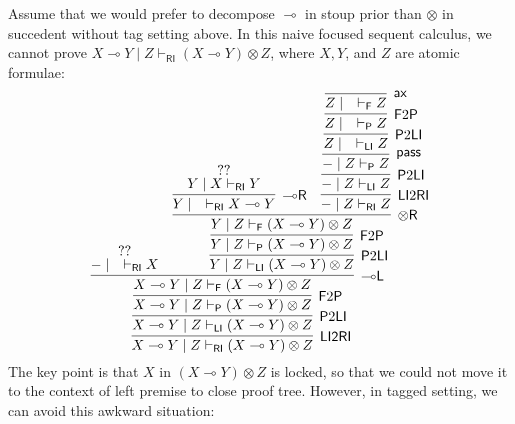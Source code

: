 \documentclass[submission,copyright,creativecommons]{eptcs}
\theoremstyle{definition}
\newcommand{\tr}{\otimes \mathsf{R}}
\newcommand{\lright}{{\multimap}\mathsf{R}}
\newcommand{\lleft}{{\multimap}\mathsf{L}}
\newcommand{\pass}{\mathsf{pass}}
\newcommand{\ax}{\mathsf{ax}}
\newcommand{\ot}{\otimes}
\newcommand{\lolli}{\multimap}
\newcommand{\RI}{\mathsf{RI}}
\newcommand{\LI}{\mathsf{LI}}
\newcommand{\Pass}{\mathsf{P}}
\newcommand{\F}{\mathsf{F}}
\begin{document}
Assume that we would prefer to decompose $\lolli$ in stoup prior than $\ot$ in succedent without tag setting above.
In this naive focused sequent calculus, we cannot prove $X \lolli Y \mid Z \vdash_{\RI} (X \lolli Y) \ot Z$, where $X, Y$, and $Z$ are atomic formulae:
\begin{displaymath}
  \infer[\mathsf{\LI 2 \RI}]{X \multimap Y \mid Z \vdash_{\mathsf{RI}} (X\multimap Y) \otimes Z}{
    \infer[\Pass 2 \LI]{X \multimap Y \mid Z \vdash_{\mathsf{LI}} (X\multimap Y) \otimes Z}{
      \infer[\F 2 \Pass]{X \multimap Y \mid Z \vdash_{\Pass} (X\multimap Y) \otimes Z}{
        \infer[\lleft]{X \multimap Y \mid Z \vdash_{\F} (X\multimap Y) \otimes Z}{
          \deduce{- \mid \quad \vdash_{\RI} X}{??}
          &
          \infer[\Pass 2 \LI]{Y \mid Z \vdash_{\LI} (X \lolli Y) \ot Z}{
            \infer[\F 2 \Pass]{Y \mid Z \vdash_{\Pass} (X \lolli Y) \ot Z}{
              \infer[\tr]{Y \mid Z \vdash_{\F} (X \lolli Y) \ot Z}{
                \infer[\lright]{Y \mid \quad \vdash_{\RI} X \lolli Y}{
                  \deduce{Y \mid X \vdash_{\RI} Y}{??}
                }
                &
                \infer[\LI 2 \RI]{- \mid Z \vdash_{\RI} Z}{
                  \infer[\Pass 2 \LI]{- \mid Z \vdash_{\LI} Z}{
                    \infer[\pass]{- \mid Z \vdash_{\Pass} Z}{
                      \infer[\Pass 2 \LI]{Z \mid \quad \vdash_{\LI} Z}{
                        \infer[\F 2 \Pass]{Z \mid \quad \vdash_{\Pass} Z}{
                          \infer[\ax]{Z \mid \quad \vdash_{\F} Z}{}
                        }
                      }
                    }
                  }
                }
              }
            }
          }
        }
      }
    }
  }
\end{displaymath}
The key point is that $X$ in $(X \lolli Y) \ot Z$ is locked, so that we could not move it to the context of left premise to close proof tree.
However, in tagged setting, we can avoid this awkward situation:
\end{document}
